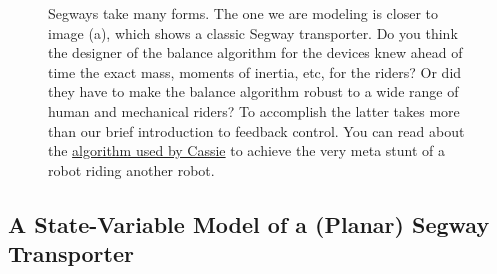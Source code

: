 \begin{figure}[htb]
    \caption[]{Segways take many forms. The one we are modeling is closer to image (a), which shows a classic Segway transporter. Do you think the designer of the balance algorithm for the devices knew ahead of time the exact mass, moments of inertia, etc, for the riders? Or did they have to make the balance algorithm robust to a wide range of human and mechanical riders? To accomplish the latter takes more than our brief introduction to feedback control. You can read about the \href{https://arxiv.org/pdf/1809.07279.pdf}{algorithm used by Cassie} to achieve the very meta stunt of a robot riding another robot.}
    \label{fig:SegwayImagesThree}
\end{figure}

\subsection{A State-Variable Model of a (Planar) Segway Transporter}

   

